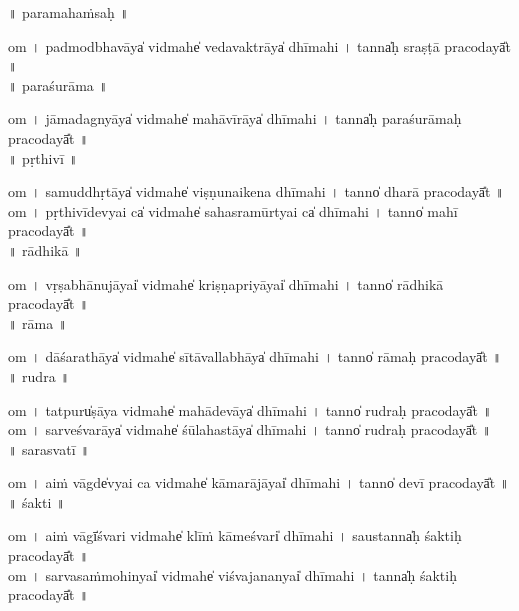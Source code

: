 \documentclass[parskip, DIV=14]{scrartcl}
\begin{document}
\vspace{0.201cm} ॥   paramahaṁsaḥ  ॥ \par
  om  । padmodbhavāya̍ vi॒dmahe̍ vedava॒ktrāya̍ dhīmahi  ।  tanna̍ḥ sraṣṭā praco॒dayā̎t ॥ \\

\vspace{0.201cm} ॥   paraśurāma  ॥ \par
  om  । jā॒ma॒da॒gnyāya̍ vi॒dmahe̍ mahāvī॒rāya̍ dhīmahi  ।  tanna̍ḥ paraśurāmaḥ praco॒dayā̎t ॥ \\

\vspace{0.201cm} ॥   pṛthivī  ॥ \par
  om  । sa॒mu॒ddhṛ॒tāya̍ vi॒dmahe̍ viṣṇunaikena dhīmahi  ।  tanno̍ dharā praco॒dayā̎t ॥ \\
  om  । pṛ॒thi॒vī॒de॒vyai ca̍ vi॒dmahe̍ sahasramū॒rtyai ca̍ dhīmahi  ।  tanno̍ mahī praco॒dayā̎t ॥ \\

\vspace{0.201cm} ॥   rādhikā  ॥ \par
  om  । vṛ॒ṣa॒bhā॒nu॒jāyai̍ vi॒dmahe̍ kriṣṇapri॒yāyai̍ dhīmahi  ।  tanno̍ rādhikā praco॒dayā̎t ॥ \\

\vspace{0.201cm} ॥   rāma  ॥ \par
  om  । dā॒śa॒ra॒thāya̍ vi॒dmahe̍ sītāvalla॒bhāya̍ dhīmahi  ।  tanno̍ rāmaḥ praco॒dayā̎t ॥ \\

\vspace{0.201cm} ॥   rudra  ॥ \par
  om  । tatpuru̍ṣāya vi॒dmahe̍ mahāde॒vāya̍ dhīmahi  ।  tanno̍ rudraḥ praco॒dayā̎t ॥ \\
  om  । sa॒rve॒śva॒rāya̍ vi॒dmahe̍ śūlaha॒stāya̍ dhīmahi  ।  tanno̍ rudraḥ praco॒dayā̎t ॥ \\

\vspace{0.201cm} ॥   sarasvatī  ॥ \par
  om  । aiṁ vāgde̍vyai ca vi॒dmahe̍ kāmarā॒jāyai̍ dhīmahi  ।  tanno̍ devī praco॒dayā̎t ॥ \\

\vspace{0.201cm} ॥   śakti  ॥ \par
  om  । aiṁ vāgī̍śvari vi॒dmahe̍ klīṁ kāme॒śvari̍ dhīmahi  ।  saustanna̍ḥ śaktiḥ praco॒dayā̎t ॥ \\
  om  । sa॒rva॒sa॒ṁmo॒hinyai̍ vi॒dmahe̍ viśvaja॒nanyai̍ dhīmahi  ।  tanna̍ḥ śaktiḥ praco॒dayā̎t ॥ \\
\end{document}
